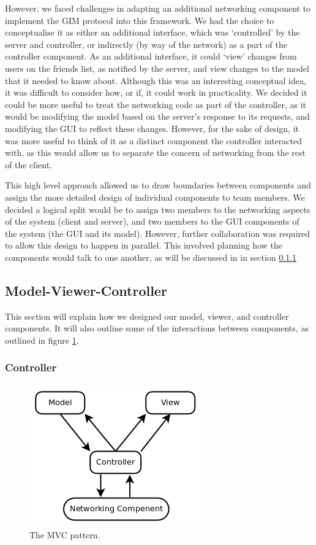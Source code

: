 However, we faced challenges in adapting an additional networking component to implement the GIM protocol into this framework. We had the choice to conceptualise it as either an additional interface, which was `controlled' by the server and controller, or indirectly (by way of the network) as a part of the controller component. As an additional interface, it could `view' changes from users on the friends list, as notified by the server, and view changes to the model that it needed to know about. Although this was an interesting conceptual idea, it was difficult to consider how, or if, it could work in practicality. We decided it could be more useful to treat the networking code as part of the controller, as it would be modifying the model based on the server's response to its requests, and modifying the GUI to reflect these changes. However, for the sake of design, it was more useful to think of it as a distinct component the controller interacted with, as this would allow us to separate the concern of networking from the rest of the client.
	
This high level approach allowed us to draw boundaries between components and assign the more detailed design of individual components to team members. We decided a logical split would be to assign two members to the networking aspects of the system (client and server), and two members to the GUI components of the system (the GUI and its model). However, further collaboration was required to allow this design to happen in parallel. This involved planning how the components would talk to one another, as will be discussed in in section \ref{controller}

\subsection {Model-Viewer-Controller}

This section will explain how we designed our model, viewer, and controller components. It will also outline some of the interactions between components, as outlined in figure \ref{mvc}. 

\subsubsection {Controller}
\label{controller}

\begin{figure}
    \begin{center}
        \includegraphics[scale=0.65]{Design/diagrams/mvc.png}
        \caption{The MVC pattern.}
        \label{mvc}
    \end{center}
\end{figure}


